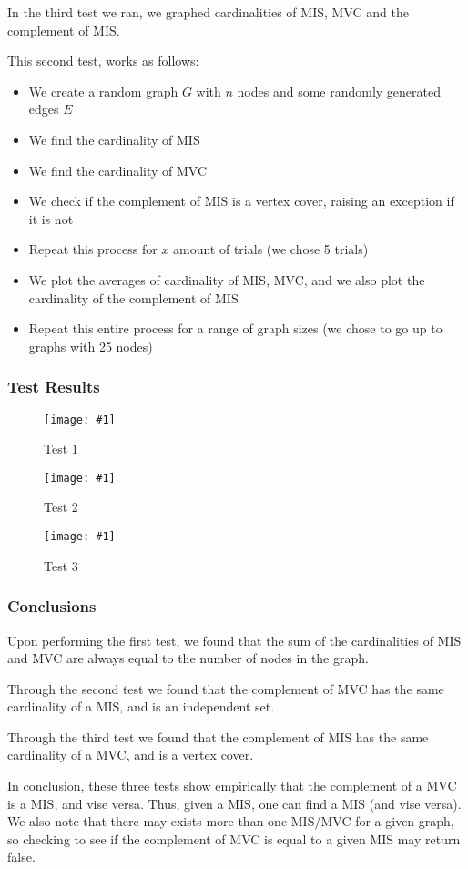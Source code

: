 \documentclass[12pt]{article}
\newcommand{\firgureBuffered}[2]
{
    \begin{figure}[ht!]
        \centering
        \texttt{[image: \#1]}
        \caption{#2}
    \end{figure}
}
\begin{document}
In the third test we ran, we graphed cardinalities of MIS, MVC and the complement of MIS.

This second test, works as follows:

\begin{itemize}
    \item We create a random graph $G$ with $n$ nodes and some randomly generated edges $E$
    \item We find the cardinality of MIS
    \item We find the cardinality of MVC
    \item We check if the complement of MIS is a vertex cover, raising an exception if it is not
    \item Repeat this process for $x$ amount of trials (we chose 5 trials)
    \item We plot the averages of cardinality of MIS, MVC, and we also plot the cardinality of the complement of MIS
    \item Repeat this entire process for a range of graph sizes (we chose to go up to graphs with 25 nodes)
\end{itemize}


\subsubsection{Test Results}

\FloatBarrier{}
\firgureBuffered{images/IndSet/Figure_1.png}{Test 1}
\firgureBuffered{images/IndSet/Figure_2.png}{Test 2}
\firgureBuffered{images/IndSet/Figure_3.png}{Test 3}
\FloatBarrier{}

\subsubsection{Conclusions}
Upon performing the first test, we found that the sum of the cardinalities of MIS and MVC are always equal
to the number of nodes in the graph. 

Through the second test we found that the complement of MVC has the same cardinality of a MIS, and is an independent set.

Through the third test we found that the complement of MIS has the same cardinality of a MVC, and is a vertex cover.

In conclusion, these three tests show empirically that the complement of a MVC is a MIS, and vise versa. Thus, given a MIS, 
one can find a MIS (and vise versa). We also note that there may exists more than one MIS/MVC for a given graph, so checking 
to see if the complement of MVC is equal to a given MIS may return false. 
\end{document}

